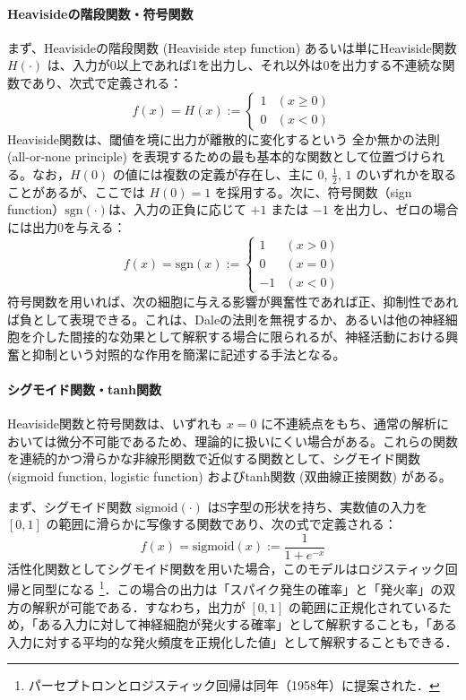 \documentclass[titlepage]{ltjsbook}
\begin{document}
\paragraph{Heavisideの階段関数・符号関数}
まず、Heavisideの階段関数 (Heaviside step function) あるいは単にHeaviside関数 $H(\cdot)$ は、入力が0以上であれば1を出力し、それ以外は0を出力する不連続な関数であり、次式で定義される：
\begin{equation}
f(x) = H(x):=
\begin{cases}
1 & (x \geq 0) \\
0 & (x < 0)
\end{cases}
\end{equation}
Heaviside関数は、閾値を境に出力が離散的に変化するという 全か無かの法則 (all-or-none principle) を表現するための最も基本的な関数として位置づけられる。なお，$H(0)$ の値には複数の定義が存在し、主に $0$, $\frac{1}{2}$, $1$ のいずれかを取ることがあるが、ここでは $H(0) = 1$ を採用する。次に、符号関数（sign function）$\mathrm{sgn}(\cdot)$は、入力の正負に応じて $+1$ または $-1$ を出力し、ゼロの場合には出力0を与える：
\begin{equation}
f(x) = \mathrm{sgn}(x):=
\begin{cases}
1 & (x > 0) \\
0 & (x = 0) \\
-1 & (x < 0)
\end{cases}
\end{equation}
符号関数を用いれば、次の細胞に与える影響が興奮性であれば正、抑制性であれば負として表現できる。これは、Daleの法則を無視するか、あるいは他の神経細胞を介した間接的な効果として解釈する場合に限られるが、神経活動における興奮と抑制という対照的な作用を簡潔に記述する手法となる。

\paragraph{シグモイド関数・tanh関数}
Heaviside関数と符号関数は、いずれも $x=0$ に不連続点をもち、通常の解析においては微分不可能であるため、理論的に扱いにくい場合がある。これらの関数を連続的かつ滑らかな非線形関数で近似する関数として、シグモイド関数 (sigmoid function, logistic function) およびtanh関数 (双曲線正接関数) がある。

まず、シグモイド関数 $\mathrm{sigmoid}(\cdot)$ はS字型の形状を持ち、実数値の入力を $[0, 1]$ の範囲に滑らかに写像する関数であり、次の式で定義される：
\begin{equation}
f(x) = \mathrm{sigmoid}(x):= \frac{1}{1 + e^{-x}}
\end{equation}
活性化関数としてシグモイド関数を用いた場合，このモデルはロジスティック回帰と同型になる \footnote{パーセプトロンとロジスティック回帰は同年（1958年）に提案された．}．この場合の出力は「スパイク発生の確率」と「発火率」の双方の解釈が可能である．すなわち，出力が $[0, 1]$ の範囲に正規化されているため，「ある入力に対して神経細胞が発火する確率」として解釈することも，「ある入力に対する平均的な発火頻度を正規化した値」として解釈することもできる．
\end{document}
